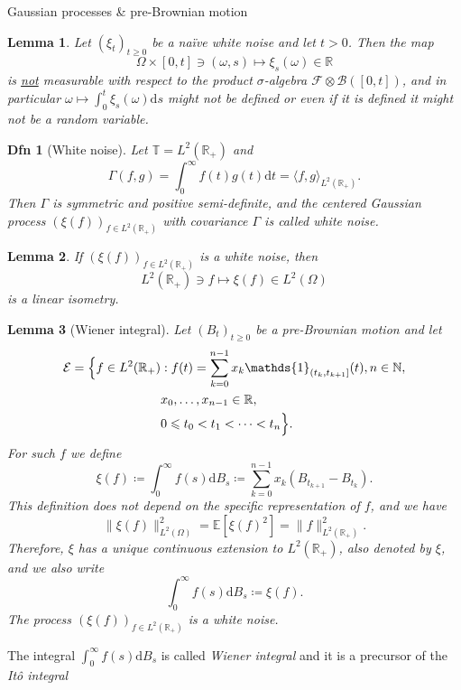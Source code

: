 \documentclass[a4paper]{article}
\theoremstyle{mytheoremstyle}
\newtheorem{definition}{Dfn}
\newtheorem{lemma}{Lemma}
\newcommand{\1}{\mathds{1}}
\begin{document}
\begin{multicols*}{3}
\begin{roundbox}{Gaussian processes \& pre-Brownian motion}
  \begin{lemma}
    Let $(\xi_t)_{t \geqslant 0}$ be a naïve white noise and let $t >
    0$. Then the map
    \[
      \Omega \times [0, t] \ni (\omega, s) \mapsto \xi_s (\omega) \in \mathbb{R}
    \]
    is {\underline{not}} measurable with respect to the product $\sigma$-algebra
    $\mathcal{F} \otimes \mathcal{B} ([0, t])$, and in particular
    $\omega \mapsto \int_0^t
    \xi_s (\omega) \mathrm{d}s$ might not be defined or even if it is
    defined it might not
    be a random variable.
  \end{lemma}

  \begin{definition}[White noise]
    Let $\mathbb{T}= L^2 (\mathbb{R}_+)$ and
    \[
      \Gamma (f, g) = \int_0^{\infty} f (t) g (t) \mathrm{d} t = \langle f, g
      \rangle_{L^2 (\mathbb{R}_+)}.
    \]
    Then $\Gamma$ is symmetric and positive semi-definite, and the centered
    Gaussian process $(\xi (f))_{f \in L^2 (\mathbb{R}_+)}$ with covariance
    $\Gamma$ is called {\emph{white noise}}.
  \end{definition}
\end{roundbox}

\begin{unlabeledbox}
  \begin{lemma}
    If $(\xi (f))_{f \in L^2 (\mathbb{R}_+)}$ is a white noise, then
    \[ L^2 (\mathbb{R}_+)
    \ni f \mapsto \xi (f) \in L^2 (\Omega) \] is a linear isometry.
  \end{lemma}

  \begin{lemma}[Wiener integral]
    \label{lem:wiener-int}Let $(B_t)_{t \geqslant 0}$ be a
    pre-Brownian motion and let
    \begin{align*}
      \mathcal{E} = \Bigl\{ f \in L^2 (\mathbb{R}_+) &: f (t) =
        \sum_{k = 0}^{n - 1} x_k
        \1_{(t_k, t_{k + 1}]} (t), n \in \mathbb{N}, \\
        & x_0, \ldots, x_{n - 1} \in \mathbb{R}, \\
      & 0 \leqslant t_0 < t_1 < \cdots < t_n \Bigr\}.
    \end{align*}
    For such $f$ we define
    \[
      \xi (f) \coloneq \int_0^{\infty} f (s) \mathrm{d} B_s \coloneq
      \sum_{k = 0}^{n - 1} x_k
      (B_{t_{k + 1}} - B_{t_k}).
    \]
    This definition does not depend on the specific representation of
    $f$, and we have
    \[
      \| \xi (f) \|_{L^2 (\Omega)}^2 =\mathbb{E} [\xi (f)^2] = \| f \|_{L^2
      (\mathbb{R}_+)}^2.
    \]
    Therefore, $\xi$ has a unique continuous extension to $L^2
    (\mathbb{R}_+)$, also denoted
    by $\xi$, and we also write
    \[
      \int_0^{\infty} f (s) \mathrm{d} B_s \coloneq \xi (f).
    \]
    The process $(\xi (f))_{f \in L^2 (\mathbb{R}_+)}$ is a white noise.
  \end{lemma}
  The integral $\int_0^{\infty} f (s) \mathrm{d} B_s$ is called
  {\emph{Wiener integral}} and
  it is a precursor of the {\emph{It{\^o} integral}}
\end{unlabeledbox}


\end{multicols*}
\end{document}
